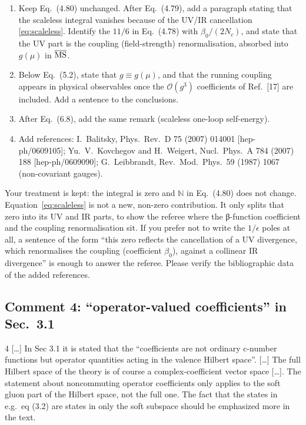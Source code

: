 \documentclass[11pt,a4paper]{article}
\newcommand{\eq}[1]{Eq.~(#1)}
\begin{document}
\begin{changes}
\begin{enumerate}[leftmargin=16pt,itemsep=2pt]
\item Keep \eq{4.80} unchanged. After \eq{4.79}, add a paragraph stating that the scaleless integral vanishes because of the UV/IR cancellation \eqref{eq:scaleless}. Identify the $11/6$ in \eq{4.78} with $\beta_0/(2N_c)$, and state that the UV part is the coupling (field-strength) renormalisation, absorbed into $g(\mu)$ in $\overline{\rm MS}$.
\item Below \eq{5.2}, state that $g\equiv g(\mu)$, and that the running coupling appears in physical observables once the $\mathcal O(g^3)$ coefficients of Ref.~[17] are included. Add a sentence to the conclusions.
\item After \eq{6.8}, add the same remark (scaleless one-loop self-energy).
\item Add references: I.~Balitsky, Phys.\ Rev.\ D 75 (2007) 014001 [hep-ph/0609105]; Yu.~V.~Kovchegov and H.~Weigert, Nucl.\ Phys.\ A 784 (2007) 188 [hep-ph/0609090]; G.~Leibbrandt, Rev.\ Mod.\ Phys.\ 59 (1987) 1067 (non-covariant gauges).
\end{enumerate}
\end{changes}

\begin{authornote}
Your treatment is kept: the integral is zero and $\mathbb N$ in \eq{4.80} does not change. Equation~\eqref{eq:scaleless} is not a new, non-zero contribution. It only splits that zero into its UV and IR parts, to show the referee where the β-function coefficient and the coupling renormalisation sit. If you prefer not to write the $1/\epsilon$ poles at all, a sentence of the form ``this zero reflects the cancellation of a UV divergence, which renormalises the coupling (coefficient $\beta_0$), against a collinear IR divergence'' is enough to answer the referee. Please verify the bibliographic data of the added references.
\end{authornote}

\subsection*{Comment 4: ``operator-valued coefficients'' in Sec.~3.1}

\begin{referee}{4}
[\dots] In Sec 3.1 it is stated that the ``coefficients are not ordinary c-number functions but operator quantities acting in the valence Hilbert space''. [\dots] The full Hilbert space of the theory is of course a complex-coefficient vector space [\dots]. The statement about noncommuting operator coefficients only applies to the soft gluon part of the Hilbert space, not the full one. The fact that the states in e.g.\ eq (3.2) are states in only the soft subspace should be emphasized more in the text.
\end{referee}
\end{document}
